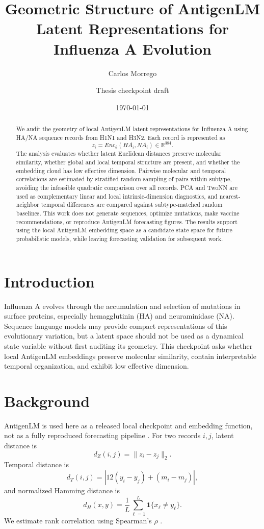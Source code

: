 \documentclass[11pt]{article}
\title{Geometric Structure of AntigenLM Latent Representations for Influenza A Evolution}
\author{Carlos Morrego \and Thesis checkpoint draft}
\date{\today}
\begin{document}
\maketitle

\begin{abstract}
We audit the geometry of local AntigenLM latent representations for Influenza A using HA/NA sequence records from H1N1 and H3N2. Each record is represented as
\[
z_i = Enc_\theta(HA_i, NA_i) \in \mathbb{R}^{384}.
\]
The analysis evaluates whether latent Euclidean distances preserve molecular similarity, whether global and local temporal structure are present, and whether the embedding cloud has low effective dimension. Pairwise molecular and temporal correlations are estimated by stratified random sampling of pairs within subtype, avoiding the infeasible quadratic comparison over all records. PCA and TwoNN are used as complementary linear and local intrinsic-dimension diagnostics, and nearest-neighbor temporal differences are compared against subtype-matched random baselines. This work does not generate sequences, optimize mutations, make vaccine recommendations, or reproduce AntigenLM forecasting figures. The results support using the local AntigenLM embedding space as a candidate state space for future probabilistic models, while leaving forecasting validation for subsequent work.
\end{abstract}

\section{Introduction}
Influenza A evolves through the accumulation and selection of mutations in surface proteins, especially hemagglutinin (HA) and neuraminidase (NA). Sequence language models may provide compact representations of this evolutionary variation, but a latent space should not be used as a dynamical state variable without first auditing its geometry. This checkpoint asks whether local AntigenLM embeddings preserve molecular similarity, contain interpretable temporal organization, and exhibit low effective dimension.

\section{Background}
AntigenLM is used here as a released local checkpoint and embedding function, not as a fully reproduced forecasting pipeline \cite{pei2026antigenlm}. For two records $i,j$, latent distance is
\[
d_Z(i,j)=\|z_i-z_j\|_2.
\]
Temporal distance is
\[
d_T(i,j)=|12(y_i-y_j)+(m_i-m_j)|,
\]
and normalized Hamming distance is
\[
d_H(x,y)=\frac{1}{L}\sum_{\ell=1}^L \mathbf{1}\{x_\ell\neq y_\ell\}.
\]
We estimate rank correlation using Spearman's $\rho$ \cite{spearman1904}.
\end{document}
